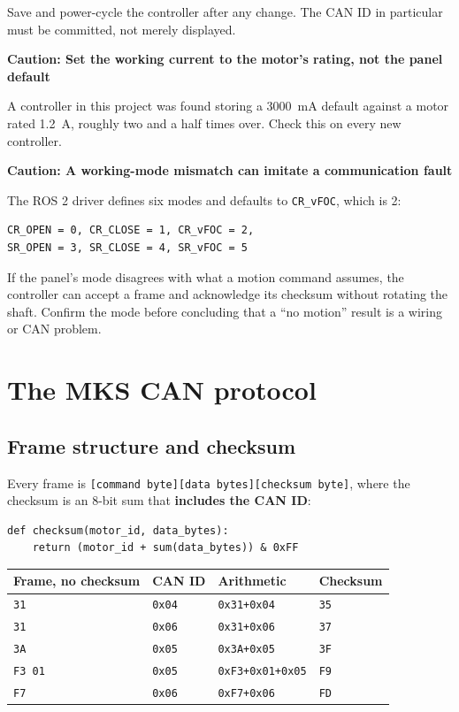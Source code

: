 \documentclass[11pt,letterpaper]{article}
\newenvironment{caution}[1]{%
    \par\addvspace{8pt}%
    \noindent{\color{cautionred}\rule{\linewidth}{0.8pt}}\par\vspace{2pt}
    \noindent\textbf{\color{cautionred}Caution: #1}\par\vspace{2pt}
}{%
    \par\vspace{2pt}\noindent{\color{cautionred}\rule{\linewidth}{0.4pt}}%
    \par\addvspace{8pt}%
}
\begin{document}
Save and power-cycle the controller after any change. The CAN ID in particular must
be committed, not merely displayed.

\begin{caution}{Set the working current to the motor's rating, not the panel default}
A controller in this project was found storing a 3000~mA default against a motor
rated 1.2~A, roughly two and a half times over. Check this on every new controller.
\end{caution}

\begin{caution}{A working-mode mismatch can imitate a communication fault}
The ROS 2 driver defines six modes and defaults to \texttt{CR\_vFOC}, which is 2:
\begin{lstlisting}
CR_OPEN = 0, CR_CLOSE = 1, CR_vFOC = 2,
SR_OPEN = 3, SR_CLOSE = 4, SR_vFOC = 5
\end{lstlisting}
If the panel's mode disagrees with what a motion command assumes, the controller can
accept a frame and acknowledge its checksum without rotating the shaft. Confirm the
mode before concluding that a ``no motion'' result is a wiring or CAN problem.
\end{caution}

\section{The MKS CAN protocol}

\subsection{Frame structure and checksum}

Every frame is \texttt{[command byte][data bytes][checksum byte]}, where the checksum
is an 8-bit sum that \textbf{includes the CAN ID}:

\begin{lstlisting}
def checksum(motor_id, data_bytes):
    return (motor_id + sum(data_bytes)) & 0xFF
\end{lstlisting}

\begin{center}
\begin{tabular}{llll}
\toprule
\textbf{Frame, no checksum} & \textbf{CAN ID} & \textbf{Arithmetic} & \textbf{Checksum} \\ \midrule
\texttt{31}    & \texttt{0x04} & \texttt{0x31+0x04}       & \texttt{35} \\
\texttt{31}    & \texttt{0x06} & \texttt{0x31+0x06}       & \texttt{37} \\
\texttt{3A}    & \texttt{0x05} & \texttt{0x3A+0x05}       & \texttt{3F} \\
\texttt{F3 01} & \texttt{0x05} & \texttt{0xF3+0x01+0x05}  & \texttt{F9} \\
\texttt{F7}    & \texttt{0x06} & \texttt{0xF7+0x06}       & \texttt{FD} \\
\bottomrule
\end{tabular}
\end{center}
\end{document}
